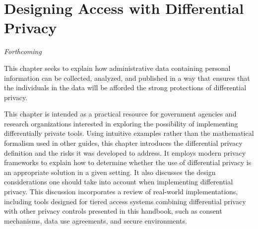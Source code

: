 \hypertarget{diffpriv}{%
\chapter{Designing Access with Differential Privacy}\label{diffpriv}}

\hrulefill

\emph{Forthcoming}

This chapter seeks to explain how administrative data containing personal information can be collected, analyzed, and published in a way that ensures that the individuals in the data will be afforded the strong protections of differential privacy.

This chapter is intended as a practical resource for government agencies and research organizations interested in exploring the possibility of implementing differentially private tools. Using intuitive examples rather than the mathematical formalism used in other guides, this chapter introduces the differential privacy definition and the risks it was developed to address. It employs modern privacy frameworks to explain how to determine whether the use of differential privacy is an appropriate solution in a given setting. It also discusses the design considerations one should take into account when implementing differential privacy. This discussion incorporates a review of real-world implementations, including tools designed for tiered access systems combining differential privacy with other privacy controls presented in this handbook, such as consent mechanisms, data use agreements, and secure environments.

\putbib

